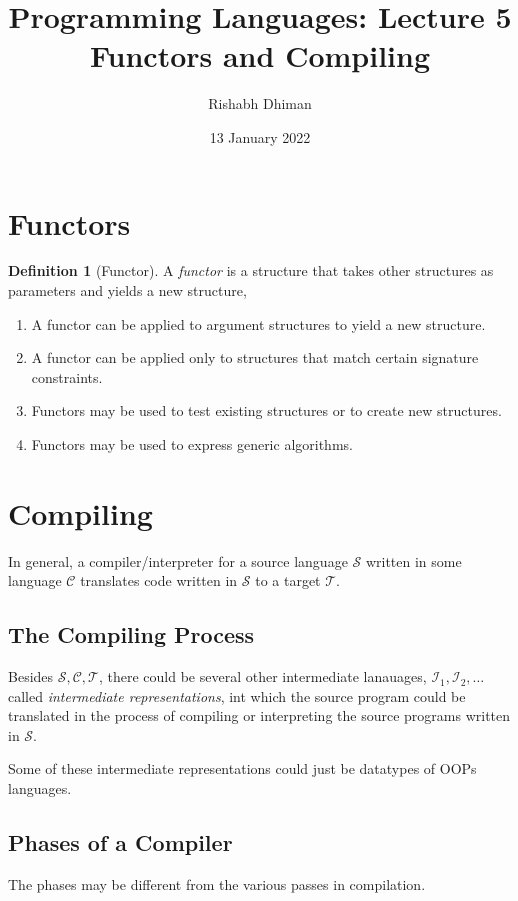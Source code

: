 \documentclass[a4paper]{scrartcl}
\title{
	Programming Languages: Lecture 5\\
	Functors and Compiling
}
\author{Rishabh Dhiman}
\date{13 January 2022}
\theoremstyle{definition}
\newtheorem{definition}{Definition}
\begin{document}
\maketitle

\section{Functors}
\begin{definition}[Functor]
	A \emph{functor} is a structure that takes other structures as parameters and yields a new structure,
	\begin{enumerate}
		\item A functor can be applied to argument structures to yield a new structure.
		\item A functor can be applied only to structures that match certain signature constraints.
		\item Functors may be used to test existing structures or to create new structures.
		\item Functors may be used to express generic algorithms.
	\end{enumerate}
\end{definition}


\section{Compiling}
In general, a compiler/interpreter for a source language $\mathcal S$ written in some language $\mathcal C$ translates code written in $\mathcal S$ to a target $\mathcal T$.

\subsection{The Compiling Process}
Besides $\mathcal S, \mathcal C, \mathcal T$, there could be several other intermediate lanauages, $\mathcal{I}_1, \mathcal{I}_2, \dots$ called \emph{intermediate representations}, int which the source program could be translated in the process of compiling or interpreting the source programs written in $\mathcal S$.

Some of these intermediate representations could just be datatypes of OOPs languages.

\subsection{Phases of a Compiler}
The phases may be different from the various passes in compilation.
\end{document}
